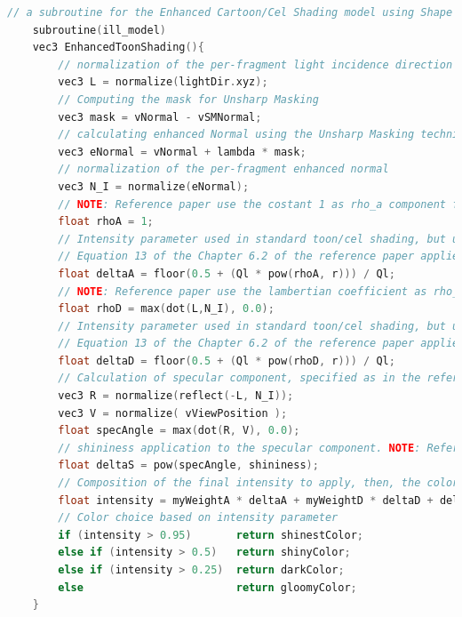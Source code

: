 \begin{lstlisting}[language=C++, caption=Enhanced Cartoon shading subroutine implemented in fragment shader,label={code:cel-enhanced}]
	// a subroutine for the Enhanced Cartoon/Cel Shading model using Shape Depiction Enhancement based on local Geometry 
	subroutine(ill_model)
	vec3 EnhancedToonShading(){
		// normalization of the per-fragment light incidence direction
		vec3 L = normalize(lightDir.xyz);
		// Computing the mask for Unsharp Masking
		vec3 mask = vNormal - vSMNormal;
		// calculating enhanced Normal using the Unsharp Masking technique. This is defined, in the reference paper, in equation 6 of chapter 4.2.2
		vec3 eNormal = vNormal + lambda * mask;
		// normalization of the per-fragment enhanced normal 
		vec3 N_I = normalize(eNormal);
		// NOTE: Reference paper use the costant 1 as rho_a component for ambient
		float rhoA = 1;
		// Intensity parameter used in standard toon/cel shading, but using our enhanced normal, for the ambient compinent
		// Equation 13 of the Chapter 6.2 of the reference paper applied only to diffuse and ambient components 
		float deltaA = floor(0.5 + (Ql * pow(rhoA, r))) / Ql;
		// NOTE: Reference paper use the lambertian coefficient as rho_d for diffuse
		float rhoD = max(dot(L,N_I), 0.0);
		// Intensity parameter used in standard toon/cel shading, but using our enhanced normal, for the diffuse component
		// Equation 13 of the Chapter 6.2 of the reference paper applied only to diffuse and ambient components 
		float deltaD = floor(0.5 + (Ql * pow(rhoD, r))) / Ql;
		// Calculation of specular component, specified as in the reference paper, using the same as Phong model
		vec3 R = normalize(reflect(-L, N_I));
		vec3 V = normalize( vViewPosition );
		float specAngle = max(dot(R, V), 0.0);
		// shininess application to the specular component. NOTE: Reference paper use the lambertian coefficient as rho_s for specular
		float deltaS = pow(specAngle, shininess);
		// Composition of the final intensity to apply, then, the color choice. NOTE: In the paper is not specified how the three components are composed. This is my solution that considers only Ambient and Diffuse components, while maintaning full specular component
		float intensity = myWeightA * deltaA + myWeightD * deltaD + deltaS;
		// Color choice based on intensity parameter
		if (intensity > 0.95)       return shinestColor;
		else if (intensity > 0.5)   return shinyColor;
		else if (intensity > 0.25)  return darkColor;
		else                        return gloomyColor;
	}
\end{lstlisting}
